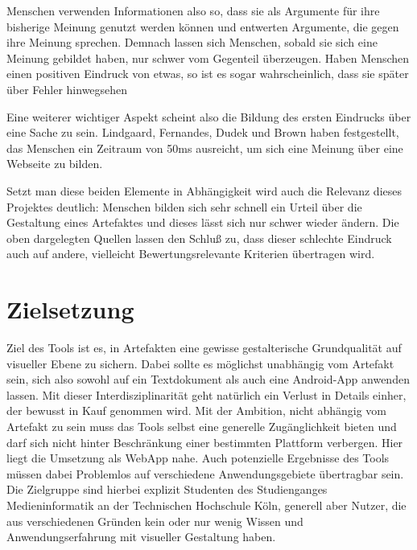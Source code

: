 Menschen verwenden Informationen also so, dass sie als Argumente für ihre bisherige Meinung genutzt werden können und entwerten Argumente, die gegen ihre Meinung sprechen. Demnach lassen sich Menschen, sobald sie sich eine Meinung gebildet haben, nur schwer vom Gegenteil überzeugen.
Haben Menschen einen positiven Eindruck von etwas, so ist es sogar wahrscheinlich, dass sie später über Fehler hinwegsehen \cite{campbell1996fitting}

Eine weiterer wichtiger Aspekt scheint also die Bildung des ersten Eindrucks über eine Sache zu sein. Lindgaard, Fernandes, Dudek und Brown haben festgestellt, das Menschen ein Zeitraum von 50ms ausreicht, um sich eine Meinung über eine Webseite zu bilden. \cite{lindgaard2006attention}

Setzt man diese beiden Elemente in Abhängigkeit wird auch die Relevanz dieses Projektes deutlich: Menschen bilden sich sehr schnell ein Urteil über die Gestaltung eines Artefaktes und dieses lässt sich nur schwer wieder ändern.
Die oben dargelegten Quellen lassen den Schluß zu, dass dieser schlechte Eindruck auch auf andere, vielleicht Bewertungsrelevante Kriterien übertragen wird.



\section{Zielsetzung}
Ziel des Tools ist es, in Artefakten eine gewisse gestalterische Grundqualität auf visueller Ebene zu sichern. Dabei sollte es möglichst unabhängig vom Artefakt sein, sich also sowohl auf ein Textdokument als auch eine Android-App anwenden lassen. Mit dieser Interdisziplinarität geht natürlich ein Verlust in Details einher, der bewusst in Kauf genommen wird.
Mit der Ambition, nicht abhängig vom Artefakt zu sein muss das Tools selbst eine generelle Zugänglichkeit bieten und darf sich nicht hinter Beschränkung einer bestimmten Plattform verbergen. Hier liegt die Umsetzung als WebApp nahe. Auch potenzielle Ergebnisse des Tools müssen dabei Problemlos auf verschiedene Anwendungsgebiete übertragbar sein.
Die Zielgruppe sind hierbei explizit Studenten des Studienganges Medieninformatik an der Technischen Hochschule Köln, generell aber Nutzer, die aus verschiedenen Gründen kein oder nur wenig Wissen und Anwendungserfahrung mit visueller Gestaltung haben.



